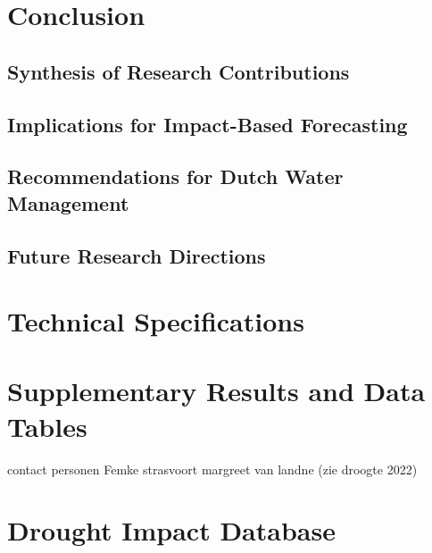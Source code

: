 \documentclass[11pt, a4paper, oneside]{book}
\begin{document}





\chapter{Conclusion}

\section{Synthesis of Research Contributions}



\section{Implications for Impact-Based Forecasting}

\section{Recommendations for Dutch Water Management}

\section{Future Research Directions}

\appendix
\chapter{Technical Specifications}
\chapter{Supplementary Results and Data Tables}
contact personen Femke strasvoort
margreet van landne (zie droogte 2022)

\chapter{Drought Impact Database}



\backmatter


\end{document}
